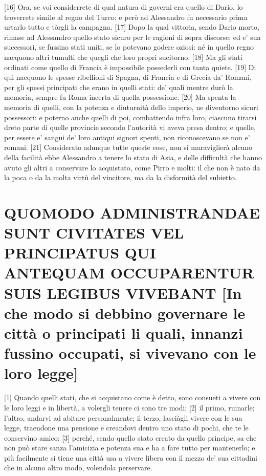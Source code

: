 {[}16{]} Ora, se voi considerrete di qual natura di governi era quello
di Dario, lo troverrete simile al regno del Turco: e però ad Alessandro
fu necessario prima urtarlo tutto e tòrgli la campagna. {[}17{]} Dopo la
qual vittoria, sendo Dario morto, rimase ad Alessandro quello stato
sicuro per le ragioni di sopra discorse; ed e' sua successori, se
fussino stati uniti, se lo potevano godere oziosi: né in quello regno
nacquono altri tumulti che quegli che loro propri sucitorno. {[}18{]} Ma
gli stati ordinati come quello di Francia è impossibile possederli con
tanta quiete. {[}19{]} Di qui nacquono le spesse ribellioni di Spagna,
di Francia e di Grecia da' Romani, per gli spessi principati che erano
in quelli stati: de' quali mentre durò la memoria, sempre fu Roma
incerta di quella possessione. {[}20{]} Ma spenta la memoria di quelli,
con la potenza e diuturnità dello imperio, ne diventorno sicuri
possessori: e poterno anche quelli di poi, combattendo infra loro,
ciascuno tirarsi dreto parte di quelle provincie secondo l'autorità vi
aveva presa dentro; e quelle, per essere e' sangui de' loro antiqui
signori spenti, non riconoscevano se non e' romani. {[}21{]} Considerato
adunque tutte queste cose, non si maraviglierà alcuno della facilità
ebbe Alessandro a tenere lo stato di Asia, e delle difficultà che hanno
avuto gli altri a conservare lo acquistato, come Pirro e molti: il che
non è nato da la poca o da la molta virtù del vincitore, ma da la
disformità del subietto.

\quebra\section{QUOMODO ADMINISTRANDAE SUNT CIVITATES VEL PRINCIPATUS QUI ANTEQUAM
OCCUPARENTUR SUIS LEGIBUS VIVEBANT\break
{[}In che modo si debbino governare le città o principati li quali,
innanzi fussino occupati, si vivevano con le loro legge{]}}

{[}1{]} Quando quelli stati, che si acquistano come è detto, sono
consueti a vivere con le loro leggi e in libertà, a volergli tenere ci
sono tre modi: {[}2{]} il primo, ruinarle; l'altro, andarvi ad abitare
personalmente; il terzo, lasciàgli vivere con le sua legge, traendone
una pensione e creandovi dentro uno stato di pochi, che te le conservino
amico: {[}3{]} perché, sendo quello stato creato da quello principe, sa
che non può stare sanza l'amicizia e potenza sua e ha a fare tutto per
mantenerlo; e più facilmente si tiene una città usa a vivere libera con
il mezzo de' sua cittadini che in alcuno altro modo, volendola
perservare.

